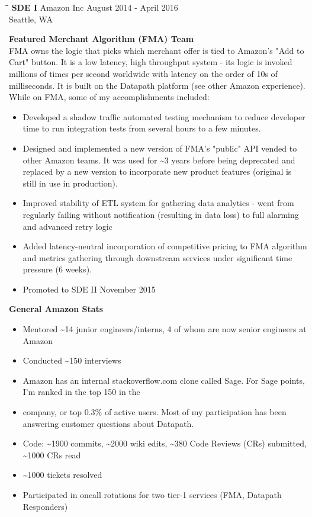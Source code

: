 \documentclass{res}
\begin{document}
\begin{resume}
   \begin{tabbing}%
   \hspace{2.2in}\= \hspace{2.2in}\= \kill %
   {\bf SDE I}  \> Amazon Inc\> August 2014 - April 2016\\
                          \> Seattle, WA
   \end{tabbing}\vspace{-17pt}
   {\large \bf Featured Merchant Algorithm (FMA) Team}\\
   FMA owns the logic that picks which merchant offer is tied to Amazon's "Add to Cart" button. It is a low latency, high throughput system - its logic is invoked millions of times per second worldwide with latency on the order of 10s of milliseconds.  It is built on the Datapath platform (see other Amazon experience).  While on FMA, some of my accomplishments included:
   \begin{itemize}
   \item Developed a shadow traffic automated testing mechanism to reduce developer time to run integration tests from several hours to a few minutes.
   \item Designed and implemented a new version of FMA’s "public" API vended to other Amazon teams.  It was used for \textasciitilde 3 years before being deprecated and replaced by a new version to incorporate new product features (original is still in use in production).
   \item Improved stability of ETL system for gathering data analytics - went from regularly failing without notification (resulting in data loss) to full alarming and advanced retry logic
   \item Added latency-neutral incorporation of competitive pricing to FMA algorithm and metrics gathering through downstream services under significant time pressure (6 weeks).
   \item Promoted to SDE II November 2015
   \end{itemize}
   
   {\large \bf General Amazon Stats}
   \begin{itemize}
   \item Mentored \textasciitilde 14 junior engineers/interns, 4 of whom are now senior engineers at Amazon
   \item Conducted \textasciitilde 150 interviews
   \item Amazon has an internal stackoverflow.com clone called Sage.  For Sage points, I'm ranked in the top 150 in the    \item company, or top 0.3\% of active users.  Most of my participation has been answering customer questions about Datapath.
   \item Code: \textasciitilde 1900 commits, \textasciitilde 2000 wiki edits, \textasciitilde 380 Code Reviews (CRs) submitted, \textasciitilde 1000 CRs read
   \item \textasciitilde 1000 tickets resolved
   \item Participated in oncall rotations for two tier-1 services (FMA, Datapath Responders)
   \end{itemize}      
   

\end{resume}
\end{document}

